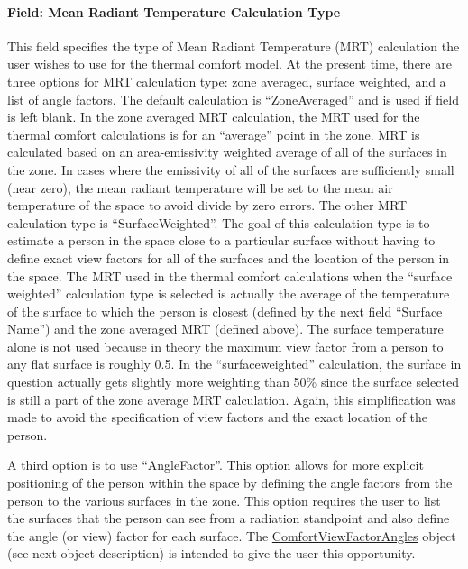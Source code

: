 \paragraph{Field: Mean Radiant Temperature Calculation Type}\label{field-mean-radiant-temperature-calculation-type}

This field specifies the type of Mean Radiant Temperature (MRT) calculation the user wishes to use for the thermal comfort model. At the present time, there are three options for MRT calculation type: zone averaged, surface weighted, and a list of angle factors. The default calculation is ``ZoneAveraged'' and is used if field is left blank. In the zone averaged MRT calculation, the MRT used for the thermal comfort calculations is for an ``average'' point in the zone. MRT is calculated based on an area-emissivity weighted average of all of the surfaces in the zone. In cases where the emissivity of all of the surfaces are sufficiently small (near zero), the mean radiant temperature will be set to the mean air temperature of the space to avoid divide by zero errors. The other MRT calculation type is ``SurfaceWeighted''. The goal of this calculation type is to estimate a person in the space close to a particular surface without having to define exact view factors for all of the surfaces and the location of the person in the space. The MRT used in the thermal comfort calculations when the ``surface weighted'' calculation type is selected is actually the average of the temperature of the surface to which the person is closest (defined by the next field ``Surface Name'') and the zone averaged MRT (defined above). The surface temperature alone is not used because in theory the maximum view factor from a person to any flat surface is roughly 0.5. In the ``surfaceweighted'' calculation, the surface in question actually gets slightly more weighting than 50\% since the surface selected is still a part of the zone average MRT calculation. Again, this simplification was made to avoid the specification of view factors and the exact location of the person.

A third option is to use ``AngleFactor''. This option allows for more explicit positioning of the person within the space by defining the angle factors from the person to the various surfaces in the zone. This option requires the user to list the surfaces that the person can see from a radiation standpoint and also define the angle (or view) factor for each surface. The \hyperref[comfortviewfactorangles]{ComfortViewFactorAngles} object (see next object description) is intended to give the user this opportunity.

